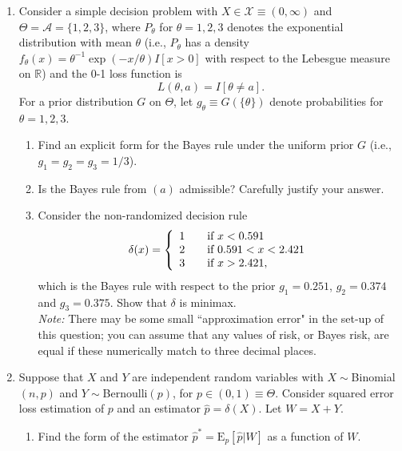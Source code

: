 \documentclass[12pt]{article}
\newcommand{\E}{\mathrm{E}}
\begin{document}
\begin{enumerate} \itemsep .6cm

  \item Consider a simple decision problem with  $X\in \mathcal{X}\equiv (0,\infty)$ and $\Theta=\mathcal{A}=\{1,2,3\}$, where $P_\theta$ for $\theta=1,2,3$ denotes
  the exponential distribution with mean $\theta$ (i.e., $P_\theta$ has a density $f_\theta(x) = \theta^{-1}\exp(-x/\theta)I[x>  0]$ with respect to the Lebesgue measure on $\mathbb{R}$) and the 0-1 loss function is
  \[
  L(\theta,a) = I[\theta \neq a].
  \]
  For a prior distribution $G$ on $\Theta$, let $g_\theta \equiv G(\{\theta\})$ denote probabilities for $\theta=1,2,3$.
  \begin{enumerate}\itemsep .2cm
  \item Find an explicit form for the Bayes rule under the uniform prior $G$ (i.e., $g_1=g_2=g_3=1/3$).
   \item  Is the Bayes rule from $(a)$ admissible?  Carefully justify your answer.

   \item Consider the non-randomized decision rule
   \[
   \delta(x) =\left\{\begin{array}{ccl}
   1 && \mbox{if $x<0.591$}\\
   2 && \mbox{if $ 0.591 < x <  2.421$}\\
   3 & & \mbox{if $ x> 2.421$},\\
   \end{array} \right.
   \]
    which is the Bayes rule with respect to the prior $g_1 = 0.251$, $g_2=0.374$ and $g_3=0.375$.  Show that $\delta$ is minimax.\\[.1cm]
    {\it Note:} There may be some small ``approximation error" in the set-up of this question; you can assume that any  values of risk, or Bayes risk, are equal if these numerically match to three decimal places.

  \end{enumerate}
   \item Suppose that $X$ and $Y$ are independent random variables with $X\sim $Binomial$(n,p)$ and $Y\sim$Bernoulli$(p)$, for $p \in (0,1)\equiv \Theta$.  Consider squared error loss estimation of $p$ and an estimator $\hat{p} = \delta(X)$.  Let $W=X+Y$.

       \begin{enumerate}\itemsep .2cm
    \item Find the form of the estimator $\hat{p}^* = \E_p[\hat{p}|W] $ as a function of $W$.



\end{enumerate}
\end{enumerate}
\end{document}
